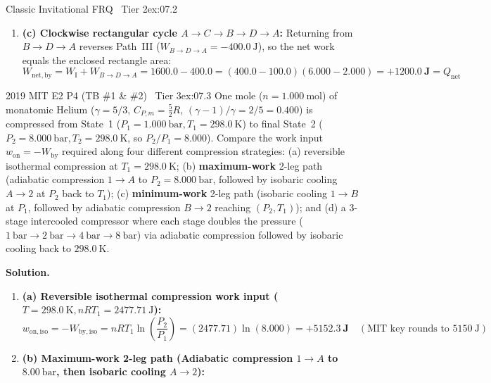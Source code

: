 \begin{workedexample}{Classic Invitational FRQ \textbar\ Tier 2}{ex:07.2}
\begin{enumerate}
  \item \textbf{(c) Clockwise rectangular cycle $A\to C\to B\to D\to A$:}
  Returning from $B\to D\to A$ reverses Path~III ($W_{B\to D\to A} = \SI{-400.0}{\joule}$), so the net work equals the enclosed rectangle area:
  \[
    W_{\mathrm{net,by}} = W_{\mathrm{I}} + W_{B\to D\to A} = 1600.0 - 400.0 = (400.0 - 100.0)(6.000 - 2.000) = \mathbf{+\SI{1200.0}{\joule}} = Q_{\mathrm{net}}
  \]
\end{enumerate}
\end{workedexample}

\begin{workedexample}{2019 MIT E2 P4 (TB \#1 \& \#2) \textbar\ Tier 3}{ex:07.3}
One mole ($n = \SI{1.000}{\mole}$) of monatomic Helium ($\gamma = 5/3$, $C_{P,m} = \frac{5}{2}R$, $(\gamma-1)/\gamma = 2/5 = 0.400$) is compressed from State~1 ($P_1 = \SI{1.000}{\bar}, T_1 = \SI{298.0}{\kelvin}$) to final State~2 ($P_2 = \SI{8.000}{\bar}, T_2 = \SI{298.0}{\kelvin}$, so $P_2/P_1 = 8.000$). Compare the work input $w_{\mathrm{on}} = -W_{\mathrm{by}}$ required along four different compression strategies: (a) reversible isothermal compression at $T_1 = \SI{298.0}{\kelvin}$; (b) \textbf{maximum-work} 2-leg path (adiabatic compression $1\to A$ to $P_2 = \SI{8.000}{\bar}$, followed by isobaric cooling $A\to 2$ at $P_2$ back to $T_1$); (c) \textbf{minimum-work} 2-leg path (isobaric cooling $1\to B$ at $P_1$, followed by adiabatic compression $B\to 2$ reaching $(P_2, T_1)$); and (d) a 3-stage intercooled compressor where each stage doubles the pressure ($\SI{1}{\bar}\to\SI{2}{\bar}\to\SI{4}{\bar}\to\SI{8}{\bar}$) via adiabatic compression followed by isobaric cooling back to $\SI{298.0}{\kelvin}$.
\par\smallskip\noindent
\textbf{Solution.}
\begin{enumerate}
  \item \textbf{(a) Reversible isothermal compression work input ($T = \SI{298.0}{\kelvin}, nRT_1 = \SI{2477.71}{\joule}$):}
  \[
    w_{\mathrm{on,iso}} = -W_{\mathrm{by,iso}} = nRT_1\ln\left(\frac{P_2}{P_1}\right) = (2477.71)\ln(8.000) = \mathbf{+\SI{5152.3}{\joule}} \quad (\text{MIT key rounds to } \SI{5150}{\joule})
  \]
  \item \textbf{(b) Maximum-work 2-leg path (Adiabatic compression $1\to A$ to $\SI{8.00}{\bar}$, then isobaric cooling $A\to 2$):}

\end{enumerate}
\end{workedexample}
